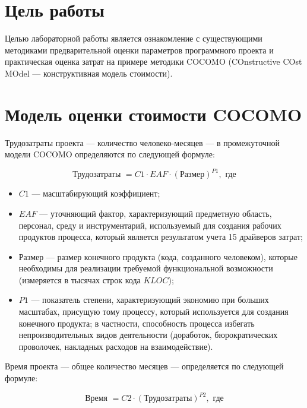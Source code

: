\setcounter{page}{2}

\section{Цель работы}

Целью лабораторной работы является ознакомление с существующими методиками предварительной оценки параметров программного проекта и практическая оценка затрат на примере методики COCOMO (COnstructive COst MOdel — конструктивная модель стоимости). 

\section{Модель оценки стоимости COCOMO}

Трудозатраты проекта --- количество человеко-месяцев --- в промежуточной модели COCOMO определяются по следующей формуле:

\begin{equation}
	\text{Трудозатраты } = C1 \cdot EAF \cdot (\text{Размер})^{P1}, \text{ где}
\end{equation}

\begin{itemize}
	\item $C1$ --- масштабирующий коэффициент;
	\item $EAF$ --- уточняющий фактор, характеризующий предметную область, персонал, среду и инструментарий, используемый для создания рабочих продуктов процесса, который является результатом учета 15 драйверов затрат;
	\item Размер --- размер конечного продукта (кода, созданного человеком), которые необходимы для реализации требуемой функциональной возможности (измеряется в тысячах строк кода $KLOC$);
	\item $P1$ --- показатель степени, характеризующий экономию при больших масштабах, присущую тому процессу, который используется для создания конечного продукта; в частности, способность процесса избегать непроизводительных видов деятельности (доработок, бюрократических проволочек, накладных расходов на взаимодействие).
\end{itemize}

Время проекта --- общее количество месяцев --- определяется по следующей формуле:

\begin{equation}
	\text{Время } = C2 \cdot(\text{Трудозатраты})^{P2}, \text{ где}
\end{equation}

